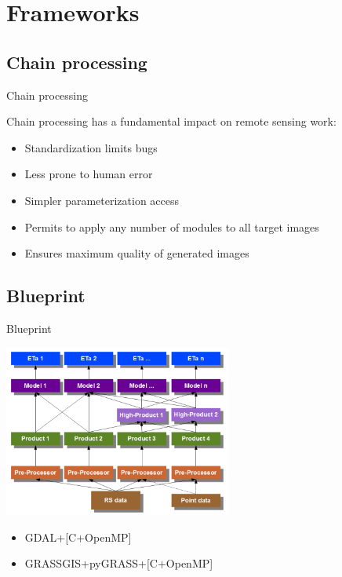 \documentclass[xcolor=dvipsnames,beamer]{beamer} %
\begin{document}
\section{Frameworks}
\subsection{Chain processing}
\begin{frame}[fragile]{Chain processing}

Chain processing has a fundamental impact on remote sensing work:\\

\begin{itemize}
 \item Standardization limits bugs
 \item Less prone to human error
 \item Simpler parameterization access
 \item Permits to apply any number of modules to all target images
 \item Ensures maximum quality of generated images
\end{itemize}

\end{frame}

\subsection{Blueprint}
\begin{frame}[fragile]{Blueprint}

\begin{center}
 \includegraphics[width=7.5cm]{chain0}
\end{center}

\begin{itemize}
 \item GDAL+[C+OpenMP]
 \item GRASSGIS+pyGRASS+[C+OpenMP]
\end{itemize}

\end{frame}
\end{document}
